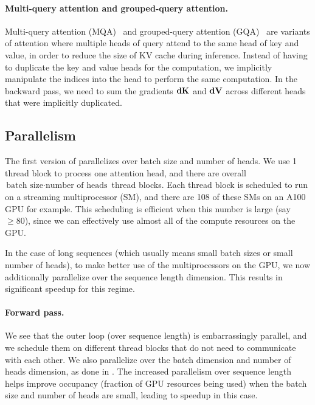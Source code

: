 \paragraph{Multi-query attention and grouped-query attention.}
Multi-query attention (MQA)~\citep{shazeer2019fast} and grouped-query attention
(GQA)~\citep{ainslie2023gqa} are variants of attention where multiple heads of
query attend to the same head of key and value, in order to reduce the size of
KV cache during inference.
Instead of having to duplicate the key and value heads for the computation, we
implicitly manipulate the indices into the head to perform the same computation.
In the backward pass, we need to sum the gradients $\mathbf{dK}$ and $\mathbf{dV}$ across
different heads that were implicitly duplicated.

\subsection{Parallelism}
\label{subsec:parallelism}

The first version of \sysnameone parallelizes over batch size and number of
heads.
We use 1 thread block to process one attention head, and there are overall
$\text{batch size} \cdot \text{number of heads}$ thread blocks.
Each thread block is scheduled to run on a streaming multiprocessor (SM), and
there are 108 of these SMs on an A100 GPU for example.
This scheduling is efficient when this number is large (say $\geq 80$), since we
can effectively use almost all of the compute resources on the GPU.

In the case of long sequences (which usually means small batch sizes or small
number of heads), to make better use of the multiprocessors on the GPU, we now
additionally parallelize over the sequence length dimension.
This results in significant speedup for this regime.


\paragraph{Forward pass.}
We see that the outer loop (over sequence length) is embarrassingly parallel,
and we schedule them on different thread blocks that do not need to communicate
with each other.
We also parallelize over the batch dimension and number of heads dimension, as
done in \sysnameone.
The increased parallelism over sequence length helps improve occupancy (fraction
of GPU resources being used) when the batch size and number of heads are small,
leading to speedup in this case.


